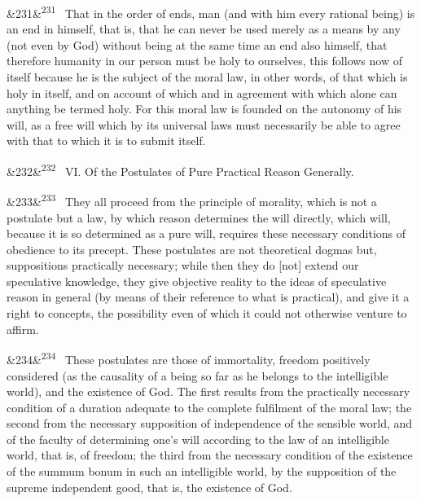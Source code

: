 \documentclass[12pt]{article}
\newcommand{\para}[1][]{\par\noindent\ifx&#1&\else\textsuperscript{\footnotesize #1}~\fi}
\begin{document}
\para[231] That in the order of ends, man (and with him every rational being) is an end in himself, that is, that he can never be used merely as a means by any (not even by God) without being at the same time an end also himself, that therefore humanity in our person must be holy to ourselves, this follows now of itself because he is the subject of the moral law, in other words, of that which is holy in itself, and on account of which and in agreement with which alone can anything be termed holy. For this moral law is founded on the autonomy of his will, as a free will which by its universal laws must necessarily be able to agree with that to which it is to submit itself.

\para[232] VI. Of the Postulates of Pure Practical Reason Generally.

\para[233] They all proceed from the principle of morality, which is not a postulate but a law, by which reason determines the will directly, which will, because it is so determined as a pure will, requires these necessary conditions of obedience to its precept. These postulates are not theoretical dogmas but, suppositions practically necessary; while then they do [not] extend our speculative knowledge, they give objective reality to the ideas of speculative reason in general (by means of their reference to what is practical), and give it a right to concepts, the possibility even of which it could not otherwise venture to affirm.

\para[234] These postulates are those of immortality, freedom positively considered (as the causality of a being so far as he belongs to the intelligible world), and the existence of God. The first results from the practically necessary condition of a duration adequate to the complete fulfilment of the moral law; the second from the necessary supposition of independence of the sensible world, and of the faculty of determining one's will according to the law of an intelligible world, that is, of freedom; the third from the necessary condition of the existence of the summum bonum in such an intelligible world, by the supposition of the supreme independent good, that is, the existence of God.
\end{document}
